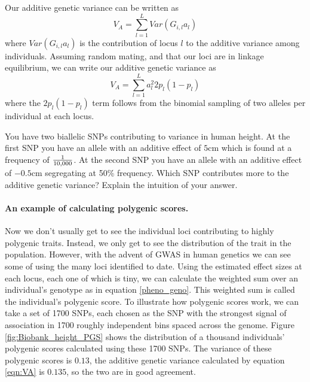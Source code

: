 Our additive genetic variance can be written as
\begin{equation}
V_A = \sum_{l=1}^L Var(G_{i,l} a_{l})
\end{equation}
where $Var(G_{i,l} a_{l})$ is the contribution of locus $l$ to the additive
variance among individuals. Assuming random mating, and that our loci are in linkage equilibrium, we can write our additive genetic variance as
\begin{equation}
V_A = \sum_{l=1}^L a_{l}^2 2 p_l(1-p_l)  \label{eqn:VA}
\end{equation}
where the $ 2 p_l(1-p_l)$ term follows from the binomial sampling of two alleles per individual at each locus. \\

\begin{question}
You have two biallelic SNPs contributing to variance in human height. At the first SNP you have an allele with an additive effect of $5$cm which is found at a frequency of $\nicefrac{1}{10,000}$. At the second SNP you have an allele with an additive effect of $-0.5$cm segregating at 50\% frequency. Which SNP contributes more to the additive genetic variance? Explain the intuition of your answer.
\end{question}
\paragraph{An example of calculating polygenic scores.}
Now we don't usually get to see the individual loci contributing to highly polygenic traits. Instead, we only get to see the distribution of the trait in the population. However, with the advent of GWAS in human genetics we can see some of  using the many  loci identified to date. Using the estimated effect sizes at each locus, each one of which is tiny, we can calculate the weighted sum over an individual's genotype as in equation \ref{pheno_geno}. This weighted sum is called the individual's polygenic score. To illustrate how polygenic scores work, we can take a set of 1700 SNPs, each chosen as the SNP with the strongest signal of association  in 1700 roughly independent bins spaced across the genome. Figure \ref{fig:Biobank_height_PGS} shows the distribution of a thousand individuals' polygenic scores calculated using these 1700 SNPs. The variance of these polygenic scores is $0.13$, the additive genetic variance calculated by equation \eqref{eqn:VA} is $0.135$, so the two are in good agreement.

